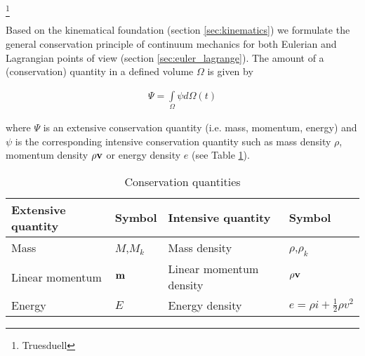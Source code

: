
\footnote{Truesduell}

Based on the kinematical foundation (section \ref{sec:kinematics}) we formulate the general conservation principle of continuum mechanics for both Eulerian and Lagrangian points of view (section \ref{sec:euler_lagrange}).
%
The amount of a (conservation) quantity in a defined volume $\Omega$ is given by

\begin{eqnarray}
\Psi =
\int\limits_\Omega \psi d\Omega(t)
\end{eqnarray}

where $\Psi$ is an extensive conservation quantity (i.e. mass, momentum, energy) and $\psi$ is the
corresponding intensive conservation quantity such as mass density $\rho$, momentum density $\rho \bf
v$ or energy density $e$ (see Table
\ref{tab:conservation_quantities}).

%
\begin{table}[htb!]
\caption{Conservation quantities}
\label{tab:conservation_quantities}
\begin{center}
\begin{tabular}{|ll|ll|}
\hline
Extensive  quantity &  Symbol    &  Intensive quantity      &  Symbol  \\
\hline \hline
Mass                &  $M$,$M_k$ & Mass density             & $\rho$,$\rho_k$  \\
Linear momentum     &  $\bf m$   & Linear momentum density  & $\rho \bf v$ \\
Energy              &  $E$       & Energy density           & $e = \rho i + \frac 1 2 \rho v^2 $
\\[1pt]
\hline
\end{tabular}
\end{center}
\end{table}
%

